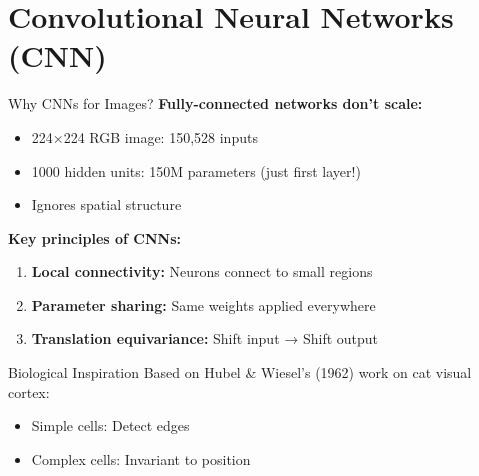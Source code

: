 \documentclass[aspectratio=169]{beamer}
\begin{document}
\section{Convolutional Neural Networks (CNN)}

\begin{frame}{Why CNNs for Images?}
  \textbf{Fully-connected networks don't scale:}
  \begin{itemize}
    \item 224×224 RGB image: 150,528 inputs
    \item 1000 hidden units: 150M parameters (just first layer!)
    \item Ignores spatial structure
  \end{itemize}

  \vspace{0.5em}

  \textbf{Key principles of CNNs:}
  \begin{enumerate}
    \item \textbf{Local connectivity:} Neurons connect to small regions
    \item \textbf{Parameter sharing:} Same weights applied everywhere
    \item \textbf{Translation equivariance:} Shift input → Shift output
  \end{enumerate}

  \vspace{0.5em}

  \begin{examplebox}{Biological Inspiration}
    Based on Hubel \& Wiesel's (1962) work on cat visual cortex:
    \begin{itemize}
      \item Simple cells: Detect edges
      \item Complex cells: Invariant to position
    \end{itemize}
  \end{examplebox}
\end{frame}
\end{document}
